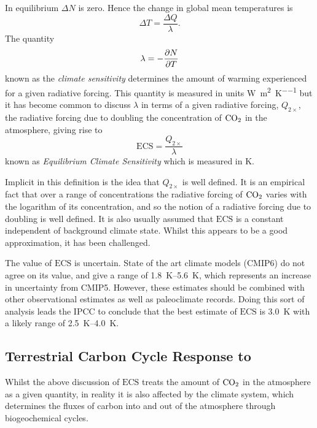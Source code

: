 In equilibrium $\Delta N$ is zero. Hence the change in global mean temperatures is
\begin{equation}
  \label{eq:response_to_radiative_forcing}
  \Delta T = \frac{\Delta Q}{\lambda}.
\end{equation}
The quantity
\begin{equation}
  \label{eq:climate_sensitivity}
  \lambda = -\pdv{N}{T}
\end{equation}
known as the \emph{climate sensitivity} determines the amount of warming experienced for a given radiative forcing. This quantity is measured
in units \si{\watt\per\square\meter\per\kelvin} but it has become common to discuss $\lambda$ in terms of a given radiative forcing, $Q_{2\times}$,
the radiative forcing due to doubling the concentration of $\ce{CO2}$ in the atmosphere, giving rise to
\begin{equation}
  \label{eq:definition_of_ECS}
  \mathrm{ECS} = \frac{Q_{2\times}}{\lambda}
\end{equation}
known as \emph{Equilibrium Climate Sensitivity} which is measured in \si{\kelvin}.

Implicit in this definition is the idea that $Q_{2\times}$ is well defined. It is an empirical fact that over a range of concentrations the radiative forcing
of $\ce{CO2}$ varies with the logarithm of its concentration, and so the notion of a radiative forcing due to doubling is well defined. It is also usually assumed that
$\mathrm{ECS}$ is a constant independent of background climate state. Whilst this appears to be a good approximation, it has been challenged.

The value of $\mathrm{ECS}$ is uncertain. State of the art climate models (CMIP6) do not agree on its value, and give a range of \SIrange{1.8}{5.6}{\kelvin}, which represents an
increase in uncertainty from CMIP5. However, these estimates should be combined with other observational estimates as well as paleoclimate records. Doing this sort of
analysis leads the IPCC to conclude that the best estimate of $\mathrm{ECS}$ is \SI{3.0}{\kelvin} with a likely range of \SIrange{2.5}{4.0}{\kelvin}.

\subsection{Terrestrial Carbon Cycle Response to }
Whilst the above discussion of $\mathrm{ECS}$ treats the amount of $\ce{CO2}$ in the atmosphere as a given quantity, in reality it is also affected by the climate
system, which determines the fluxes of carbon into and out of the atmosphere through biogeochemical cycles.

